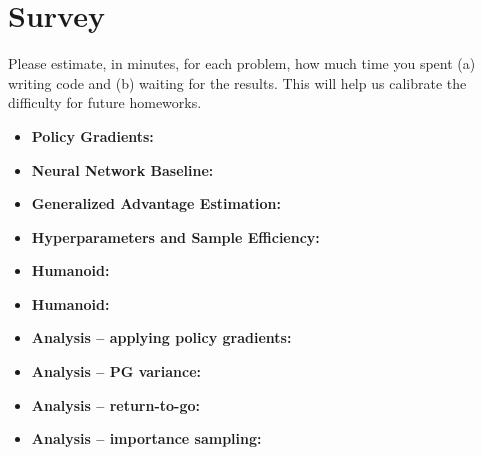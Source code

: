 \documentclass{article}
\begin{document}
\setcounter{section}{8}
\newpage\section{Survey}
\label{sec:survey}
Please estimate, in minutes, for each problem, how much time you spent (a) writing code and (b) waiting for the results. This will help us calibrate the difficulty for future homeworks. 
\begin{itemize}
        \item \textbf{Policy Gradients:}
        \item \textbf{Neural Network Baseline:}
        \item \textbf{Generalized Advantage Estimation:}
        \item \textbf{Hyperparameters and Sample Efficiency:}
        \item \textbf{Humanoid:}
        \item \textbf{Humanoid:}
        \item \textbf{Analysis -- applying policy gradients:}
        \item \textbf{Analysis -- PG variance:}
        \item \textbf{Analysis -- return-to-go:}
        \item \textbf{Analysis -- importance sampling:}
\end{itemize}
\end{document}
